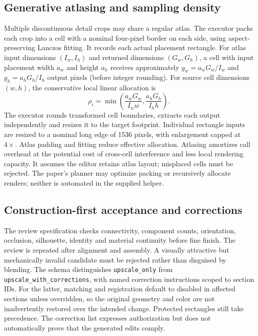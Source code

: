 \documentclass[10pt,twocolumn]{article}
\begin{document}
\subsection{Generative atlasing and sampling density}
Multiple discontinuous detail crops may share a regular atlas. The executor packs each crop into a cell with a nominal four-pixel border on each side, using aspect-preserving Lanczos fitting. It records each actual placement rectangle. For atlas input dimensions $(I_w,I_h)$ and returned dimensions $(G_w,G_h)$, a cell with input placement width $a_w$ and height $a_h$ receives approximately $g_w=a_wG_w/I_w$ and $g_h=a_hG_h/I_h$ output pixels (before integer rounding). For source cell dimensions $(w,h)$, the conservative local linear allocation is
\begin{equation}
\rho_i=\min\left(\frac{a_wG_w}{I_ww},\frac{a_hG_h}{I_hh}\right).
\end{equation}
The executor rounds transformed cell boundaries, extracts each output independently and resizes it to the target footprint. Individual rectangle inputs are resized to a nominal long edge of 1536 pixels, with enlargement capped at $4\times$. Atlas padding and fitting reduce effective allocation. Atlasing amortizes call overhead at the potential cost of cross-cell interference and less local rendering capacity. It assumes the editor retains atlas layout; misplaced cells must be rejected. The paper's planner may optimize packing or recursively allocate renders; neither is automated in the supplied helper.

\subsection{Construction-first acceptance and corrections}
The review specification checks connectivity, component counts, orientation, occlusion, silhouette, identity and material continuity before fine finish. The review is repeated after alignment and assembly. A visually attractive but mechanically invalid candidate must be rejected rather than disguised by blending. The schema distinguishes \texttt{upscale\_only} from \texttt{upscale\_with\_corrections}, with named correction instructions scoped to section IDs. For the latter, matching and registration default to disabled in affected sections unless overridden, so the original geometry and color are not inadvertently restored over the intended change. Protected rectangles still take precedence. The correction list expresses authorization but does not automatically prove that the generated edits comply.
\end{document}
